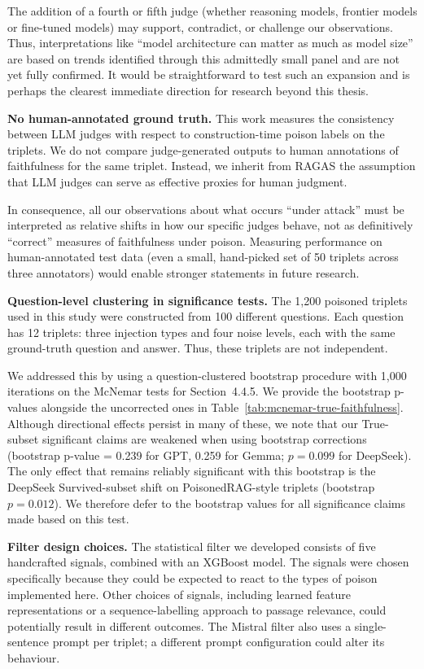 The addition of a fourth or fifth judge (whether reasoning models, frontier models or fine-tuned models) may support, contradict, or challenge our observations. Thus, interpretations like ``model architecture can matter as much as model size'' are based on trends identified through this admittedly small panel and are not yet fully confirmed. It would be straightforward to test such an expansion and is perhaps the clearest immediate direction for research beyond this thesis.

\textbf{No human-annotated ground truth.} This work measures the consistency between LLM judges with respect to construction-time poison labels on the triplets. We do not compare judge-generated outputs to human annotations of faithfulness for the same triplet. Instead, we inherit from RAGAS the assumption that LLM judges can serve as effective proxies for human judgment.

In consequence, all our observations about what occurs ``under attack'' must be interpreted as relative shifts in how our specific judges behave, not as definitively ``correct'' measures of faithfulness under poison. Measuring performance on human-annotated test data (even a small, hand-picked set of 50 triplets across three annotators) would enable stronger statements in future research.

\textbf{Question-level clustering in significance tests.} The 1,200 poisoned triplets used in this study were constructed from 100 different questions. Each question has 12 triplets: three injection types and four noise levels, each with the same ground-truth question and answer. Thus, these triplets are not independent.

We addressed this by using a question-clustered bootstrap procedure with 1,000 iterations on the McNemar tests for Section~4.4.5. We provide the bootstrap p-values alongside the uncorrected ones in Table~\ref{tab:mcnemar-true-faithfulness}. Although directional effects persist in many of these, we note that our True-subset significant claims are weakened when using bootstrap corrections (bootstrap p-value = 0.239 for GPT, 0.259 for Gemma; $p = 0.099$ for DeepSeek). The only effect that remains reliably significant with this bootstrap is the DeepSeek Survived-subset shift on PoisonedRAG-style triplets (bootstrap $p = 0.012$). We therefore defer to the bootstrap values for all significance claims made based on this test.

\textbf{Filter design choices.} The statistical filter we developed consists of five handcrafted signals, combined with an XGBoost model. The signals were chosen specifically because they could be expected to react to the types of poison implemented here. Other choices of signals, including learned feature representations or a sequence-labelling approach to passage relevance, could potentially result in different outcomes. The Mistral filter also uses a single-sentence prompt per triplet; a different prompt configuration could alter its behaviour.

